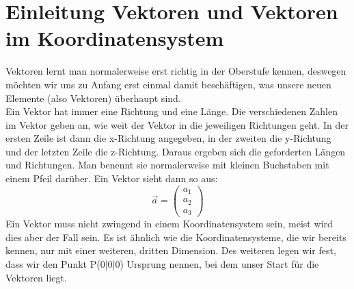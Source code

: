 \section{Einleitung Vektoren und Vektoren im Koordinatensystem}
	Vektoren lernt man normalerweise erst richtig in der Oberstufe kennen, deswegen
	möchten wir uns zu Anfang erst einmal damit beschäftigen, was unsere neuen
	Elemente (also Vektoren) überhaupt sind.\\
	Ein Vektor hat immer eine Richtung und eine Länge. Die verschiedenen Zahlen im
	Vektor geben an, wie weit der Vektor in die jeweiligen Richtungen geht. In der
	ersten Zeile ist dann die x-Richtung angegeben, in der zweiten die y-Richtung
	und der letzten Zeile die z-Richtung. Daraus ergeben sich die geforderten
	Längen und Richtungen. Man benennt sie normalerweise mit kleinen Buchstaben mit
	einem Pfeil darüber. Ein Vektor sieht dann so aus:
	\[\vec{a}=\begin{pmatrix}
	 a_1\\
	 a_2\\
	 a_3
	\end{pmatrix}\]
	Ein Vektor muss nicht zwingend in einem Koordinatensystem sein, meist wird dies
	aber der Fall sein. Es ist ähnlich wie die Koordinatensysteme, die wir bereits
	kennen, nur mit einer weiteren, dritten Dimension. Des weiteren legen wir fest,
	dass wir den Punkt P(0|0|0) Ursprung nennen, bei dem unser Start für die
	Vektoren liegt.

	
